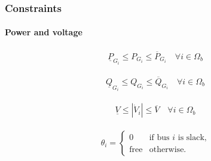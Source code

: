 \documentclass[
	11pt, %
	aspectratio=169, %
]{beamer}
\begin{document}

\begin{frame}
	\frametitle{Constraints}
	\framesubtitle{Power and voltage} %

	\begin{align}
	\label{eq:cons_power_P}
		\underline{P}_{G_{i}} \leq P_{G_{i}} \leq \overline{P}_{G_{i}}  \quad \forall i \in \Omega_{b}
	\end{align}

	\begin{align}
	\label{eq:cons_power_Q}
		\underline{Q}_{G_{i}} \leq Q_{G_{i}} \leq \overline{Q}_{G_{i}}  \quad \forall i \in \Omega_{b}
	\end{align}

	\begin{align}
	\label{eq:cons_voltage}
		\underline{V} \leq \left|\dot{V}_{i} \right| \leq \overline{V}  \quad \forall i \in \Omega_{b}
	\end{align}

	\begin{align}
	\label{eq:cons_slack}
		\theta_{i} =
		\begin{cases}
			0 & \text{if bus $i$ is slack,} \\
			\text{free} & \text{otherwise.}
		\end{cases}
	\end{align}

\end{frame}

\end{document}
